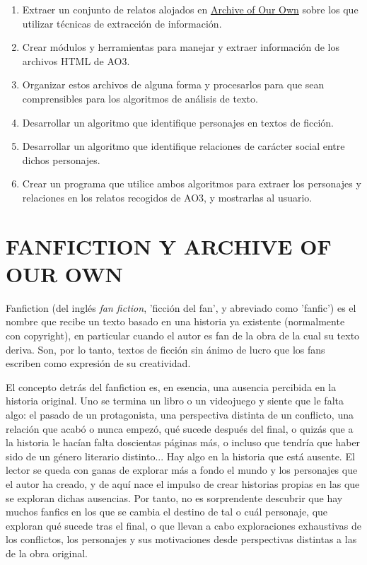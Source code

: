 \documentclass{pre-tfg}
\begin{document}
\begin{enumerate}
	\item Extraer un conjunto de relatos alojados en \href{http://wwww.archiveofourown.org}{Archive of Our Own} sobre los que utilizar técnicas de extracción de información.
	\item Crear módulos y herramientas para manejar y extraer información de los archivos HTML de AO3.
	\item Organizar estos archivos de alguna forma y procesarlos para que sean comprensibles para los algoritmos de análisis de texto.
	\item Desarrollar un algoritmo que identifique personajes en textos de ficción.
	\item Desarrollar un algoritmo que identifique relaciones de carácter social entre dichos personajes.
	\item Crear un programa que utilice ambos algoritmos para extraer los personajes y relaciones en los relatos recogidos de AO3, y mostrarlas al usuario.
\end{enumerate}



\cleardoublepage
\section{FANFICTION Y ARCHIVE OF OUR OWN}

Fanfiction (del inglés \textit{fan fiction}, 'ficción del fan', y abreviado como 'fanfic') es el nombre que recibe un texto basado en una historia ya existente (normalmente con copyright), en particular cuando el autor es fan de la obra de la cual su texto deriva. Son, por lo tanto, textos de ficción sin ánimo de lucro que los fans escriben como expresión de su creatividad.

El concepto detrás del fanfiction es, en esencia, una ausencia percibida en la historia original. Uno se termina un libro o un videojuego y siente que le falta algo: el pasado de un protagonista, una perspectiva distinta de un conflicto, una relación que acabó o nunca empezó, qué sucede después del final, o quizás que a la historia le hacían falta doscientas páginas más, o incluso que tendría que haber sido de un género literario distinto... Hay algo en la historia que está ausente. El lector se queda con ganas de explorar más a fondo el mundo y los personajes que el autor ha creado, y de aquí nace el impulso de crear historias propias en las que se exploran dichas ausencias. Por tanto, no es sorprendente descubrir que hay muchos fanfics en los que se cambia el destino de tal o cuál personaje, que exploran qué sucede tras el final, o que llevan a cabo exploraciones exhaustivas de los conflictos, los personajes y sus motivaciones desde perspectivas distintas a las de la obra original.
\end{document}
